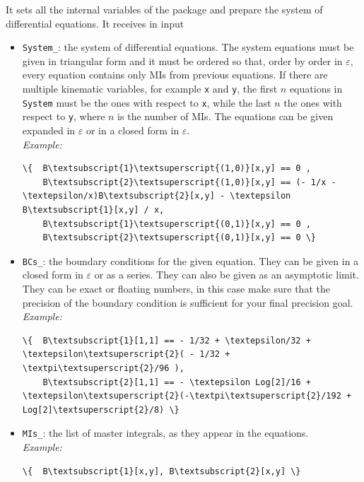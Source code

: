 \documentclass[final,1p,times]{elsarticle}
\begin{document}
\begin{itemize}
    It sets all the internal variables of the package and prepare the system of differential equations. It receives in input
    \begin{itemize}
        \item \texttt{System\_}: the system of differential equations. The system equations must be given in triangular form and it must be ordered so that, order by order in $\varepsilon$, every equation contains only MIs from previous equations. If there are multiple kinematic variables, for example \texttt{x} and \texttt{y}, the first $n$ equations in \texttt{System} must be the ones with respect to \texttt{x}, while the last $n$ the ones with respect to \texttt{y}, where $n$ is the number of MIs. The equations can be given expanded in $\varepsilon$ or in a closed form in $\varepsilon$.\\
        \textit{Example:}
\begin{Verbatim}[commandchars=\\\{\}]
\{  B\textsubscript{1}\textsuperscript{(1,0)}[x,y] == 0 ,
    B\textsubscript{2}\textsuperscript{(1,0)}[x,y] == (- 1/x - \textepsilon/x)B\textsubscript{2}[x,y] - \textepsilon B\textsubscript{1}[x,y] / x,
    B\textsubscript{1}\textsuperscript{(0,1)}[x,y] == 0 ,
    B\textsubscript{2}\textsuperscript{(0,1)}[x,y] == 0 \}
\end{Verbatim}
        \item \texttt{BCs\_}: the boundary conditions for the given equation. They can be given in a closed form in $\varepsilon$ or as a series. They can also be given as an asymptotic limit. They can be exact or floating numbers, in this case make sure that the precision of the boundary condition is sufficient for your final precision goal.
        \\
        \textit{Example:}
\begin{Verbatim}[commandchars=\\\{\}]
\{  B\textsubscript{1}[1,1] == - 1/32 + \textepsilon/32 + \textepsilon\textsuperscript{2}( - 1/32 + \textpi\textsuperscript{2}/96 ),
    B\textsubscript{2}[1,1] == - \textepsilon Log[2]/16 + \textepsilon\textsuperscript{2}(-\textpi\textsuperscript{2}/192 + Log[2]\textsuperscript{2}/8) \}
\end{Verbatim}
        
        \item \texttt{MIs\_}: the list of master integrals, as they appear in the equations.\\
        \textit{Example:}
\begin{Verbatim}[commandchars=\\\{\}]
\{  B\textsubscript{1}[x,y], B\textsubscript{2}[x,y] \} 
\end{Verbatim}
        

\end{itemize}
\end{itemize}
\end{document}

